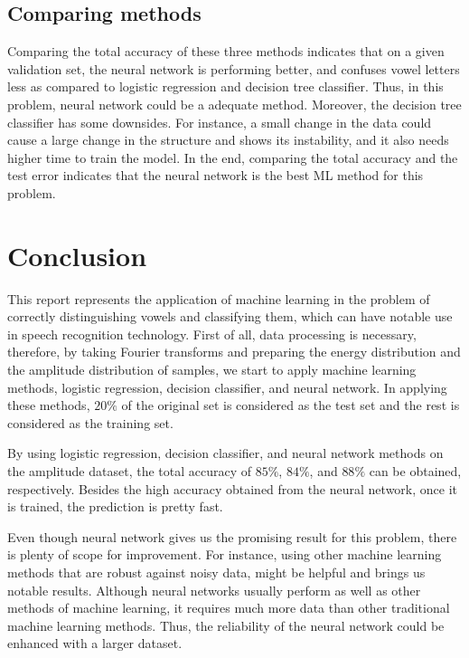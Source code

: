 \documentclass[letterpaper,12pt]{article}
\begin{document}
\subsection{Comparing methods}

Comparing the total accuracy of these three methods indicates that on a given validation set, the neural network is performing better, and confuses vowel letters less as compared to logistic regression and decision tree classifier. Thus, in this problem, neural network could be a adequate method. Moreover, the decision tree classifier has some downsides. For instance, a small change in the data could cause a large change in the structure and shows its instability, and it also needs higher time to train the model. In the end, comparing the total accuracy and the test error indicates that the neural network is the best ML method for this problem.

\section{Conclusion}
This report represents the application of machine learning in the problem of correctly distinguishing vowels and classifying them, which can have notable use in speech recognition technology. First of all, data processing is necessary, therefore, by taking Fourier transforms and preparing the energy distribution and the amplitude distribution of samples, we start to apply machine learning methods, logistic regression, decision classifier, and neural network. In applying these methods, $20\%$ of the original set is considered as the test set and the rest is considered as the training set.

By using logistic regression, decision classifier, and neural network methods on the amplitude dataset, the total accuracy of $85\%$, $84\%$, and $88\%$ can be obtained, respectively. Besides the high accuracy obtained from the neural network, once it is trained, the prediction is pretty fast.

Even though neural network gives us the promising result for this problem, there is plenty of scope for improvement. For instance, using other machine learning methods that are robust against noisy data, might be helpful and brings us notable results. Although neural networks usually perform as well as other methods of machine learning, it requires much more data than other traditional machine learning methods. Thus, the reliability of the neural network could be enhanced with a larger dataset.
\end{document}
